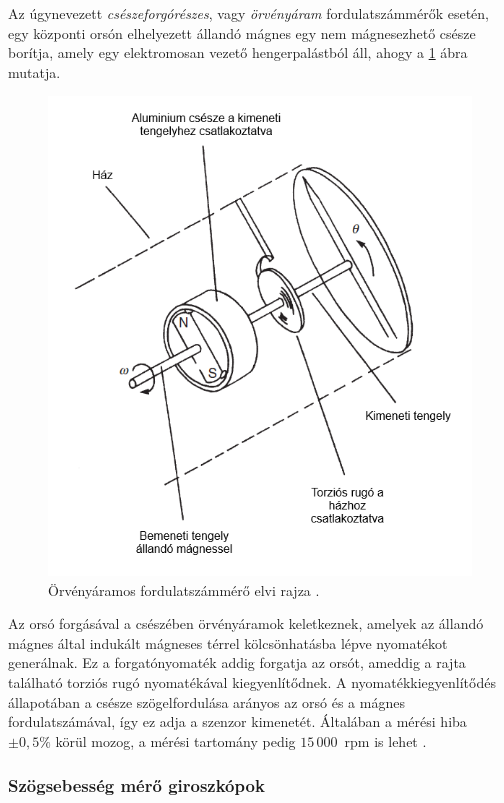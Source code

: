 Az úgynevezett \textit{csészeforgórészes}, vagy \textit{örvényáram} fordulatszámmérők esetén, egy központi orsón elhelyezett állandó mágnes egy nem mágnesezhető csésze borítja, amely egy elektromosan vezető hengerpalástból áll, ahogy a \ref{dragcup} ábra mutatja.
\begin{figure}
	\centering
	\includegraphics[width=\columnwidth*6/10]{figures/dragcup.png}
	\caption{Örvényáramos fordulatszámmérő elvi rajza \cite{Morris2016b}.}
	\label{dragcup}
\end{figure}
Az orsó forgásával a csészében örvényáramok keletkeznek, amelyek az állandó mágnes által indukált mágneses térrel kölcsönhatásba lépve nyomatékot generálnak. Ez a forgatónyomaték addig forgatja az orsót, ameddig a rajta található torziós rugó nyomatékával kiegyenlítődnek. A nyomatékkiegyenlítődés állapotában a csésze szögelfordulása arányos az orsó és a mágnes fordulatszámával, így ez adja a szenzor kimenetét. Általában a mérési hiba $\pm 0,5\%$ körül mozog, a mérési tartomány pedig $15\,000$~rpm is lehet \cite{Morris2016b}.

\subsubsection{Szögsebesség mérő giroszkópok}

